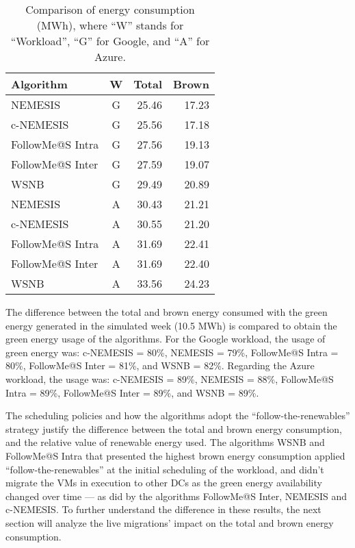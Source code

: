 \begin{table}[!h]
\caption{Comparison of energy consumption (MWh), where ``W'' stands for ``Workload'', ``G'' for Google, and ``A'' for Azure.}\label{tab:total_energy_cons} \centering
\begin{tabular}{|l|c|r|r|}
  \hline
  \textbf{Algorithm} & \textbf{W} & \textbf{Total} &  \textbf{Brown} \\
  \hline  
  NEMESIS  & G & 25.46 & 17.23 \\
  \hline
  c-NEMESIS & G & 25.56 & 17.18 \\
  \hline
  FollowMe@S Intra  & G & 27.56 & 19.13 \\
  \hline
  FollowMe@S Inter  & G & 27.59 & 19.07 \\
  \hline
  WSNB  & G & 29.49 & 20.89 \\
  \hline
  NEMESIS  & A  & 30.43 & 21.21 \\
  \hline
  c-NEMESIS & A  & 30.55 & 21.20 \\
  \hline
  FollowMe@S Intra  & A  & 31.69 & 22.41 \\
  \hline
  FollowMe@S Inter  & A  & 31.69 & 22.40 \\
  \hline
  WSNB & A   & 33.56 & 24.23 \\
  \hline
\end{tabular}
\end{table}

The difference between the total and brown energy consumed with the green energy generated in the simulated week (10.5 MWh) is compared to obtain the green energy usage of the algorithms. For the Google workload, the usage of green energy was: c-NEMESIS = 80\%, NEMESIS = 79\%, FollowMe@S Intra = 80\%, FollowMe@S Inter = 81\%, and WSNB = 82\%. Regarding the Azure workload, the usage was: c-NEMESIS = 89\%, NEMESIS = 88\%, FollowMe@S Intra = 89\%, FollowMe@S Inter = 89\%, and WSNB = 89\%. 


The scheduling policies and how the algorithms adopt the ``follow-the-renewables'' strategy justify the difference between the total and brown energy consumption, and the relative value of renewable energy used. The algorithms WSNB and FollowMe@S Intra that presented the highest brown energy consumption applied ``follow-the-renewables'' at the initial scheduling of the workload, and didn't migrate the VMs in execution to other DCs as the green energy availability changed over time --- as did by the algorithms FollowMe@S Inter, NEMESIS and c-NEMESIS. To further understand the difference in these results, the next section will analyze the live migrations' impact on the total and brown energy consumption.

